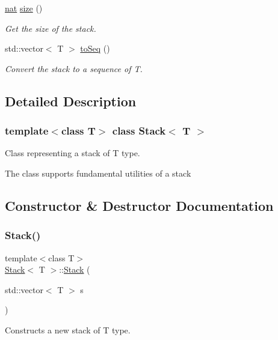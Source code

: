 \begin{DoxyCompactItemize}
\hyperlink{_card_types_8h_a56638ee9d162e8cce3a15f92d2023d6e}{nat} \hyperlink{class_stack_a6aad92f7dc41a4dcd858bb4ff1f96cec}{size} ()
\begin{DoxyCompactList}\small\item\em Get the size of the stack. \end{DoxyCompactList}\item 
std\+::vector$<$ T $>$ \hyperlink{class_stack_a928be02635c7f5bf2bab3699aee07f52}{to\+Seq} ()
\begin{DoxyCompactList}\small\item\em Convert the stack to a sequence of T. \end{DoxyCompactList}\end{DoxyCompactItemize}


\subsection{Detailed Description}
\subsubsection*{template$<$class T$>$\newline
class Stack$<$ T $>$}

Class representing a stack of T type. 

The class supports fundamental utilities of a stack 

\subsection{Constructor \& Destructor Documentation}
\mbox{\label{class_stack_acf1a315995090bf9cf957ac84175c82c}} 
\subsubsection{\texorpdfstring{Stack()}{Stack()}}
{\footnotesize\ttfamily template$<$class T$>$ \\
\hyperlink{class_stack}{Stack}$<$ T $>$\+::\hyperlink{class_stack}{Stack} (\begin{DoxyParamCaption}\item[{std\+::vector$<$ T $>$}]{s }\end{DoxyParamCaption})}



Constructs a new stack of T type. 


